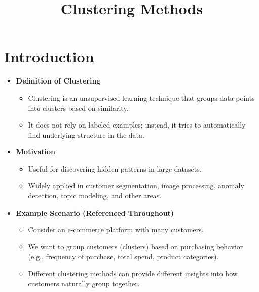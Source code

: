 \documentclass[10pt]{article}
\title{Clustering Methods}
\author{}
\date{}
\begin{document}
\maketitle

\section{Introduction}
\begin{itemize}
    \item \textbf{Definition of Clustering}
    \begin{itemize}
        \item Clustering is an unsupervised learning technique that groups data points into clusters based on similarity.
        \item It does not rely on labeled examples; instead, it tries to automatically find underlying structure in the data.
    \end{itemize}
    \item \textbf{Motivation}
    \begin{itemize}
        \item Useful for discovering hidden patterns in large datasets.
        \item Widely applied in customer segmentation, image processing, anomaly detection, topic modeling, and other areas.
    \end{itemize}
    \item \textbf{Example Scenario (Referenced Throughout)}
    \begin{itemize}
        \item Consider an e-commerce platform with many customers.
        \item We want to group customers (clusters) based on purchasing behavior (e.g., frequency of purchase, total spend, product categories).
        \item Different clustering methods can provide different insights into how customers naturally group together.
    \end{itemize}
\end{itemize}
\end{document}
